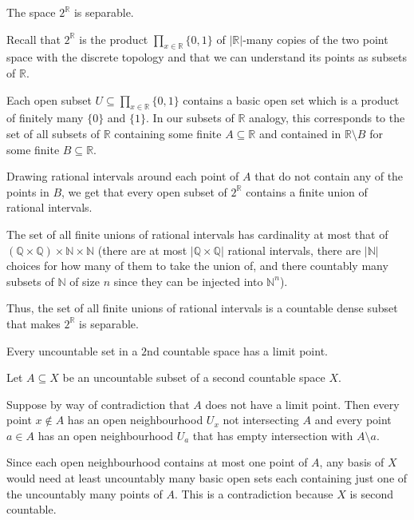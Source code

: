 \documentclass[12 pt, letterpaper]{hmcpset}
\begin{document}
\pagebreak

\begin{problem}[5.6]
	The space $2^{\mathbb{R}}$ is separable.
\end{problem}

\begin{solution}
	Recall that $2^{\mathbb{R}}$ is the product $\prod_{x \in \mathbb{R}} \{ 0, 1 \}$ of $\lvert \mathbb{R} \rvert$-many copies of the two point space with the discrete topology and that we can understand its points as subsets of $\mathbb{R}$.

	Each open subset $U \subseteq \prod_{x \in \mathbb{R}} \{ 0, 1 \}$ contains a basic open set which is a product of finitely many $\{ 0 \}$ and $\{ 1 \}$. In our subsets of $\mathbb{R}$ analogy, this corresponds to the set of all subsets of $\mathbb{R}$ containing some finite $A \subseteq \mathbb{R}$ and contained in $\mathbb{R} \setminus B$ for some finite $B \subseteq \mathbb{R}$.

	Drawing rational intervals around each point of $A$ that do not contain any of the points in $B$, we get that every open subset of $2^{\mathbb{R}}$ contains a finite union of rational intervals.

	The set of all finite unions of rational intervals has cardinality at most that of $(\mathbb{Q} \times \mathbb{Q}) \times \mathbb{N} \times \mathbb{N}$ (there are at most $\lvert \mathbb{Q} \times \mathbb{Q} \rvert$ rational intervals, there are $\lvert \mathbb{N} \rvert$ choices for how many of them to take the union of, and there countably many subsets of $\mathbb{N}$ of size $n$ since they can be injected into $\mathbb{N}^n$).

	Thus, the set of all finite unions of rational intervals is a countable dense subset that makes $2^{\mathbb{R}}$ is separable.
\end{solution}

\pagebreak

\begin{problem}[5.11]
	Every uncountable set in a $2$nd countable space has a limit point.
\end{problem}

\begin{solution}
	Let $A \subseteq X$ be an uncountable subset of a second countable space $X$.

	Suppose by way of contradiction that $A$ does not have a limit point. Then every point $x \not\in A$ has an open neighbourhood $U_{x}$ not intersecting $A$ and every point $a \in A$ has an open neighbourhood $U_{a}$ that has empty intersection with ${A \setminus a}$. 

Since each open neighbourhood contains at most one point of $A$, any basis of $X$ would need at least uncountably many basic open sets each containing just one of the uncountably many points of $A$. This is a contradiction because $X$ is second countable.
\end{solution}
\end{document}
